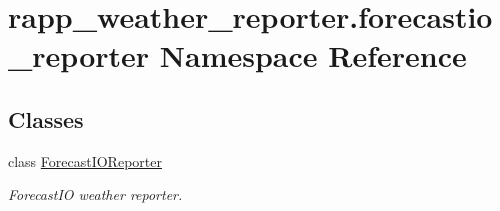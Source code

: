 \hypertarget{namespacerapp__weather__reporter_1_1forecastio__reporter}{\section{rapp\-\_\-weather\-\_\-reporter.\-forecastio\-\_\-reporter Namespace Reference}
\label{namespacerapp__weather__reporter_1_1forecastio__reporter}
}
\subsection*{Classes}
\begin{DoxyCompactItemize}
\item 
class \hyperlink{classrapp__weather__reporter_1_1forecastio__reporter_1_1ForecastIOReporter}{Forecast\-I\-O\-Reporter}
\begin{DoxyCompactList}\small\item\em Forecast\-I\-O weather reporter. \end{DoxyCompactList}\end{DoxyCompactItemize}
